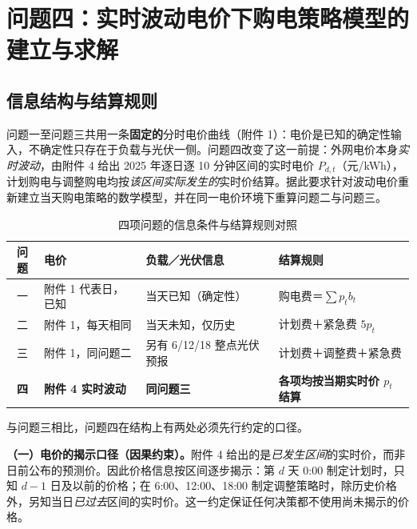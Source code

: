 
\section{问题四：实时波动电价下购电策略模型的建立与求解}

\subsection{信息结构与结算规则}
\label{sec:q4-frame}

问题一至问题三共用一条\textbf{固定的}分时电价曲线（附件 1）：电价是已知的确定性输入，不确定性只存在于负载与光伏一侧。问题四改变了这一前提：外网电价本身\emph{实时波动}，由附件 4 给出 2025 年逐日逐 10 分钟区间的实时电价 $P_{d,t}$（元/kWh），计划购电与调整购电均按\emph{该区间实际发生的}实时价结算。据此要求针对波动电价重新建立当天购电策略的数学模型，并在同一电价环境下重算问题二与问题三。

\begin{table}[htbp]
  \centering
  \caption{四项问题的信息条件与结算规则对照}
  \label{tab:q4-compare}
  \footnotesize
  \begin{tabularx}{\textwidth}{clXX}
    \toprule
    问题 & 电价 & 负载／光伏信息 & 结算规则 \\
    \midrule
    一 & 附件 1 代表日，已知 & 当天已知（确定性） & 购电费＝$\sum p_t b_t$ \\
    二 & 附件 1，每天相同 & 当天未知，仅历史 & 计划费＋紧急费 $5p_t$ \\
    三 & 附件 1，同问题二 & 另有 6/12/18 整点光伏预报 & 计划费＋调整费＋紧急费 \\
    \textbf{四} & \textbf{附件 4 实时波动} & \textbf{同问题三} & \textbf{各项均按当期实时价 $p_t$ 结算} \\
    \bottomrule
  \end{tabularx}
\end{table}

与问题三相比，问题四在结构上有两处必须先行约定的口径。

\textbf{（一）电价的揭示口径（因果约束）。}附件 4 给出的是\emph{已发生区间}的实时价，而非日前公布的预测价。因此价格信息按区间逐步揭示：第 $d$ 天 0:00 制定计划时，只知 $d-1$ 日及以前的价格；在 6:00、12:00、18:00 制定调整策略时，除历史价格外，另知当日\emph{已过去}区间的实时价。这一约定保证任何决策都不使用尚未揭示的价格。


